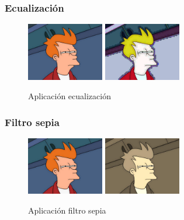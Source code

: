 \subsubsection{Ecualización}
\vskip0.3cm
\begin{figure}[H]
 \centering
  \includegraphics[width=0.3\textwidth]{imagenes/Fry.jpg}
  \includegraphics[width=0.3\textwidth]{imagenes/fryEcualizacion.jpg}
 \caption{Aplicación ecualización}
 \label{diseño}
\end{figure}
\subsubsection{Filtro sepia}
\vskip0.3cm
\begin{figure}[H]
 \centering
  \includegraphics[width=0.3\textwidth]{imagenes/Fry.jpg}
  \includegraphics[width=0.3\textwidth]{imagenes/frySepia.jpg}
 \caption{Aplicación filtro sepia}
 \label{diseño}
\end{figure}
